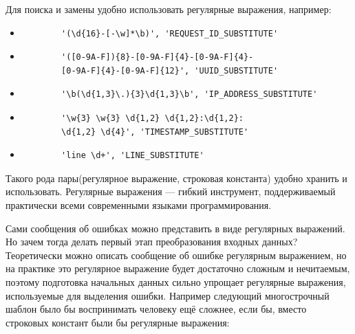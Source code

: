 Для поиска и замены удобно использовать регулярные выражения, например:
\begin{center}
  \begin{itemize}
    \item
      \begin{verbatim}
        '(\d{16}-[-\w]*\b)', 'REQUEST_ID_SUBSTITUTE'
      \end{verbatim}
    \item
      \begin{verbatim}
        '([0-9A-F]){8}-[0-9A-F]{4}-[0-9A-F]{4}-
        [0-9A-F]{4}-[0-9A-F]{12}', 'UUID_SUBSTITUTE'
      \end{verbatim}
    \item
      \begin{verbatim}
        '\b(\d{1,3}\.){3}\d{1,3}\b', 'IP_ADDRESS_SUBSTITUTE'
      \end{verbatim}

    \item
      \begin{verbatim}
        '\w{3} \w{3} \d{1,2} \d{1,2}:\d{1,2}:
        \d{1,2} \d{4}', 'TIMESTAMP_SUBSTITUTE'
      \end{verbatim}
    \item
      \begin{verbatim}
        'line \d+', 'LINE_SUBSTITUTE'
      \end{verbatim}
  \end{itemize}
\end{center}

Такого рода пары(регулярное выражение, строковая константа) удобно хранить и
использовать. Регулярные выражения --- гибкий инструмент, поддерживаемый
практически всеми современными языками программирования.

Сами сообщения об ошибках можно представить в виде регулярных выражений.
Но зачем тогда делать первый этап преобразования входных данных? Теоретически
можно описать сообщение об ошибке регулярным выражением, но на практике
это регулярное выражение будет достаточно сложным и нечитаемым, поэтому
подготовка начальных данных сильно упрощает регулярные выражения, используемые
для выделения ошибки. Например следующий многострочный шаблон было бы
воспринимать человеку ещё сложнее, если бы, вместо строковых констант были бы
регулярные выражения:


